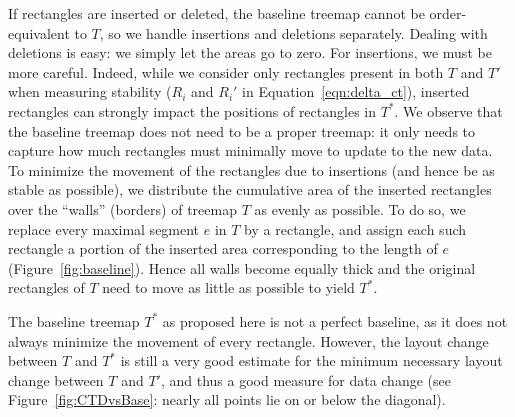 If rectangles are inserted or deleted, the baseline treemap cannot be order-equivalent to $T$, so we handle insertions and deletions separately. Dealing with deletions is easy: we simply let the areas go to zero. For insertions, we must be more careful. Indeed, while we consider only rectangles present in both $T$ and $T'$ when measuring stability ($R_i$ and $R_i'$ in Equation~\ref{eqn:delta_ct}), inserted rectangles can strongly impact the positions of rectangles in $T^*$. We observe that the baseline treemap does not need to be a proper treemap: it only needs to capture how much rectangles must minimally move to update to the new data. To minimize the movement of the rectangles due to insertions (and hence be as stable as possible), we distribute the cumulative area of the inserted rectangles over the ``walls'' (borders) of treemap $T$ as evenly as possible. To do so, we replace every maximal segment $e$ in $T$ by a rectangle, and assign each such rectangle a portion of the inserted area corresponding to the length of $e$ (Figure~\ref{fig:baseline}). Hence all walls become equally thick and the original rectangles of $T$ need to move as little as possible to yield $T^*$.

The baseline treemap $T^*$ as proposed here is not a perfect baseline, as it does not always minimize the movement of every rectangle. However, the layout change between $T$ and $T^*$ is still a very good estimate for the minimum necessary layout change between $T$ and $T'$, and thus a good measure for data change (see Figure~\ref{fig:CTDvsBase}: nearly all points lie on or below the diagonal). 

